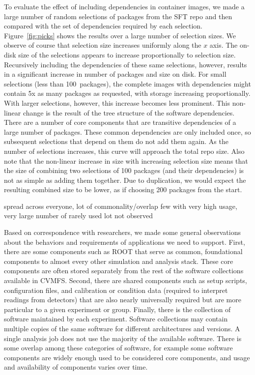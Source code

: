 \documentclass[sigconf]{acmart}
\begin{document}
To evaluate the effect of including dependencies in container images,
we made a large number of random selections of packages from the SFT repo and then compared with the set of dependencies required by each selection.
Figure~\ref{fig:picks} shows the results over a large number of selection sizes.
We observe of course that selection size increases uniformly along the $x$ axis.
The on-disk size of the selections appears to increase proportionally to selection size.
Recursively including the dependencies of these same selections,
however, results in a significant increase in number of packages and size on disk.
For small selections (less than 100~packages),
the complete images with dependencies might contain 5x as many packages as requested,
with storage increasing proportionally.
With larger selections, however,
this increase becomes less prominent.
This non-linear change is the result of the tree structure of the software dependencies.
There are a number of core components that are transitive dependencies of a large number of packages.
These common dependencies are only included once,
so subsequent selections that depend on them do not add them again.
As the number of selections increases,
this curve will approach the total repo size.
Also note that the non-linear increase in size with increasing selection size means that the size of combining two selections of 100 packages (and their dependencies) is not as simple as adding them together.
Due to duplication, we would expect the resulting combined size to be lower,
as if choosing 200 packages from the start.


spread across everyone, lot of commonality/overlap
few with very high usage, very large number of rarely used
lot not observed
\fi

Based on correspondence with researchers,
we made some general observations about the behaviors and requirements of applications we need to support.
First, there are some components such as ROOT that serve as common, foundational components to almost every other simulation and analysis stack.
These core components are often stored separately from the rest of the software collections available in CVMFS.
Second, there are shared components such as setup scripts, configuration files, and calibration or condition data (required to interpret readings from detectors) that are also nearly universally required but are more particular to a given experiment or group.
Finally, there is the collection of software maintained by each experiment.
Software collections may contain multiple copies of the same software for different architectures and versions.
A single analysis job does not use the majority of the available software.
There is some overlap among these categories of software,
for example some software components are widely enough used to be considered core components,
and usage and availability of components varies over time.
\end{document}
